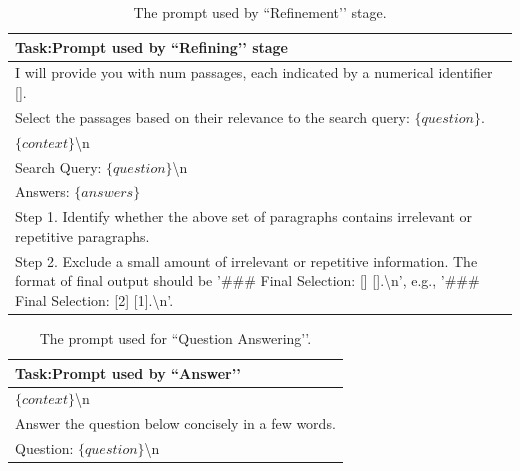 \documentclass[11pt]{article}
\begin{document}
\begin{table}[h!t]
    \centering
    \begin{tabularx}{0.925\linewidth}{>{\raggedright\arraybackslash}X}
        \toprule
        \textbf{Task}:Prompt used by ``Refining’’ stage \\
        \midrule
I will provide you with {num} passages, each indicated by a numerical identifier [].\\ 
Select the passages based on their relevance to the search query: $\{question\}$.\\
$\{context\}$\textbackslash n\\
Search Query: $\{question\}$\textbackslash n \\
Answers: $\{answers\}$ \\
Step 1. Identify whether the above set of paragraphs contains irrelevant or repetitive paragraphs.\\
Step 2. Exclude a small amount of irrelevant or repetitive information. The format of final output should be '\#\#\# Final Selection: [] [].\textbackslash n', e.g., '\#\#\# Final Selection: [2] [1].\textbackslash n'. \\ 
    \bottomrule
    \end{tabularx}
    \caption{The prompt used by ``Refinement’’ stage.}
    \label{tab:prompt-refine}
\end{table}

\begin{table}[h!t]
    \centering
    \begin{tabularx}{0.925\linewidth}{>{\raggedright\arraybackslash}X}
        \toprule
        \textbf{Task}:Prompt used by ``Answer’’ \\
        \midrule
        $\{context\}$\textbackslash n\\
        Answer the question below concisely in a few words.\\
        Question: $\{question\}$\textbackslash n\\ 
    \bottomrule
    \end{tabularx}
    \caption{The prompt used for ``Question Answering’’.}
    \label{tab:prompt-answer}
\end{table}
\end{document}
